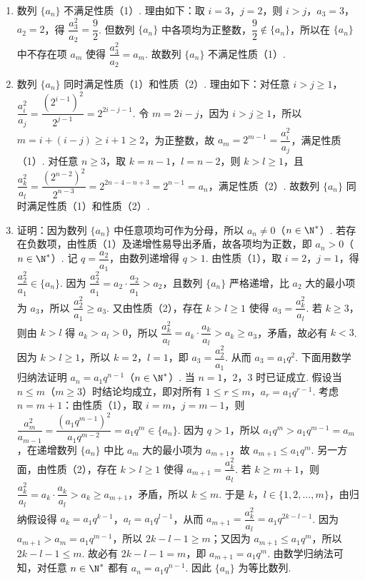\begin{solution}
\begin{enumerate}
    \item 数列 \(\{a_n\}\) 不满足性质（1）. 理由如下：取 \(i=3\)，\(j=2\)，则 \(i>j\)，\(a_3=3\)，\(a_2=2\)，得 \(\dfrac{a_3^2}{a_2}=\dfrac{9}{2}\). 但数列 \(\{a_n\}\) 中各项均为正整数，\(\dfrac92\notin\{a_n\}\)，所以在 \(\{a_n\}\) 中不存在项 \(a_m\) 使得 \(\dfrac{a_3^2}{a_2}=a_m\). 故数列 \(\{a_n\}\) 不满足性质（1）.
    \item 数列 \(\{a_n\}\) 同时满足性质（1）和性质（2）. 理由如下：对任意 \(i>j\ge1\)，\(\dfrac{a_i^2}{a_j}=\dfrac{(2^{i-1})^2}{2^{j-1}}=2^{2i-j-1}\). 令 \(m=2i-j\)，因为 \(i>j\ge1\)，所以 \(m=i+(i-j)\ge i+1\ge2\)，为正整数，故 \(a_m=2^{m-1}=\dfrac{a_i^2}{a_j}\)，满足性质（1）. 对任意 \(n\ge3\)，取 \(k=n-1\)，\(l=n-2\)，则 \(k>l\ge1\)，且 \(\dfrac{a_k^2}{a_l}=\dfrac{(2^{n-2})^2}{2^{n-3}}=2^{2n-4-n+3}=2^{n-1}=a_n\)，满足性质（2）. 故数列 \(\{a_n\}\) 同时满足性质（1）和性质（2）.
    \item 证明：因为数列 \(\{a_n\}\) 中任意项均可作为分母，所以 \(a_n\neq0\)（\(n\in\N^*\)）. 若存在负数项，由性质（1）及递增性易导出矛盾，故各项均为正数，即 \(a_n>0\)（\(n\in\N^*\)）. 记 \(q=\dfrac{a_2}{a_1}\)，由数列递增得 \(q>1\). 由性质（1），取 \(i=2\)，\(j=1\)，得 \(\dfrac{a_2^2}{a_1}\in\{a_n\}\). 因为 \(\dfrac{a_2^2}{a_1}=a_2\cdot\dfrac{a_2}{a_1}>a_2\)，且数列 \(\{a_n\}\) 严格递增，比 \(a_2\) 大的最小项为 \(a_3\)，所以 \(\dfrac{a_2^2}{a_1}\ge a_3\). 又由性质（2），存在 \(k>l\ge1\) 使得 \(a_3=\dfrac{a_k^2}{a_l}\). 若 \(k\ge3\)，则由 \(k>l\) 得 \(a_k>a_l>0\)，所以 \(\dfrac{a_k^2}{a_l}=a_k\cdot\dfrac{a_k}{a_l}>a_k\ge a_3\)，矛盾，故必有 \(k<3\). 因为 \(k>l\ge1\)，所以 \(k=2\)，\(l=1\)，即 \(a_3=\dfrac{a_2^2}{a_1}\). 从而 \(a_3=a_1 q^2\). 下面用数学归纳法证明 \(a_n=a_1 q^{n-1}\)（\(n\in\N^*\)）. 当 \(n=1\)，\(2\)，\(3\) 时已证成立. 假设当 \(n\le m\)（\(m\ge3\)）时结论均成立，即对所有 \(1\le r\le m\)，\(a_r=a_1 q^{r-1}\). 考虑 \(n=m+1\)：由性质（1），取 \(i=m\)，\(j=m-1\)，则 \(\dfrac{a_m^2}{a_{m-1}}=\dfrac{(a_1 q^{m-1})^2}{a_1 q^{m-2}}=a_1 q^m\in\{a_n\}\). 因为 \(q>1\)，所以 \(a_1 q^m>a_1 q^{m-1}=a_m\)，在递增数列 \(\{a_n\}\) 中比 \(a_m\) 大的最小项为 \(a_{m+1}\)，故 \(a_{m+1}\le a_1 q^m\). 另一方面，由性质（2），存在 \(k>l\ge1\) 使得 \(a_{m+1}=\dfrac{a_k^2}{a_l}\). 若 \(k\ge m+1\)，则 \(\dfrac{a_k^2}{a_l}=a_k\cdot\dfrac{a_k}{a_l}>a_k\ge a_{m+1}\)，矛盾，所以 \(k\le m\). 于是 \(k\)，\(l\in\{1,2,\dots,m\}\)，由归纳假设得 \(a_k=a_1 q^{k-1}\)，\(a_l=a_1 q^{l-1}\)，从而 \(a_{m+1}=\dfrac{a_k^2}{a_l}=a_1 q^{2k-l-1}\). 因为 \(a_{m+1}>a_m=a_1 q^{m-1}\)，所以 \(2k-l-1\ge m\)；又因为 \(a_{m+1}\le a_1 q^m\)，所以 \(2k-l-1\le m\). 故必有 \(2k-l-1=m\)，即 \(a_{m+1}=a_1 q^m\). 由数学归纳法可知，对任意 \(n\in\N^*\) 都有 \(a_n=a_1 q^{n-1}\). 因此 \(\{a_n\}\) 为等比数列.
\end{enumerate}
\end{solution}
